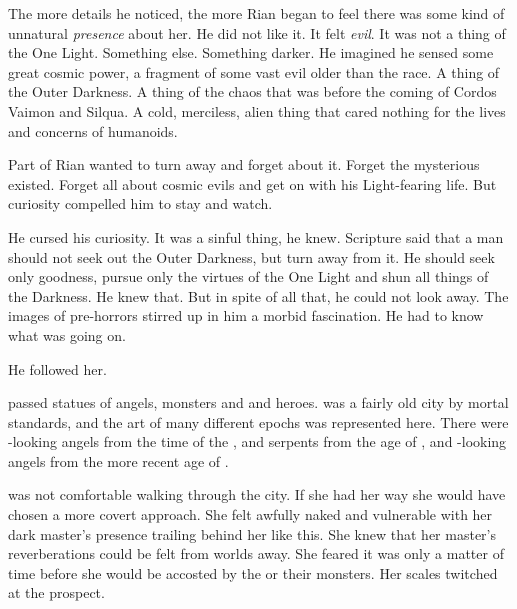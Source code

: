 The more details he noticed, the more Rian began to feel there was some kind of unnatural \emph{presence} about her. 
He did not like it. 
It felt \emph{evil}. 
It was not a thing of the One Light.
Something else. 
Something darker.
He imagined he sensed some great cosmic power, a fragment of some vast evil older than the \human race. 
A thing of the Outer Darkness. 
A thing of the chaos that was before the coming of Cordos Vaimon and Silqua. 
A cold, merciless, alien thing that cared nothing for the lives and concerns of humanoids. 

Part of Rian wanted to turn away and forget about it.
Forget the mysterious \scatha existed. 
Forget all about cosmic evils and get on with his Light-fearing life. 
But curiosity compelled him to stay and watch.

He cursed his curiosity.
It was a sinful thing, he knew.
Scripture said that a man should not seek out the Outer Darkness, but turn away from it. 
He should seek only goodness, pursue only the virtues of the One Light and shun all things of the Darkness. 
He knew that.
But in spite of all that, he could not look away. 
The images of pre-\human horrors stirred up in him a morbid fascination.
He had to know what was going on. 


He followed her. 



\begin{comment}
  \subsection{Criseis walks through the city}
\end{comment}
\new
\Criseis passed statues of angels, monsters and \scathaese and \human heroes. 
\Malcur was a fairly old city by mortal standards, and the art of many different epochs was represented here. 
There were \human-looking angels from the time of the \VaimonCaliphate, \dragons and serpents from the age of \Ortaica, and \scathaese-looking angels from the more recent age of \Tepharae.

\Criseis was not comfortable walking through the city.
If she had her way she would have chosen a more covert approach. 
She felt awfully naked and vulnerable with her dark master's presence trailing behind her like this. 
She knew that her master's reverberations could be felt from worlds away. 
She feared it was only a matter of time before she would be accosted by the \resphain or their monsters.
Her scales twitched at the prospect. 

